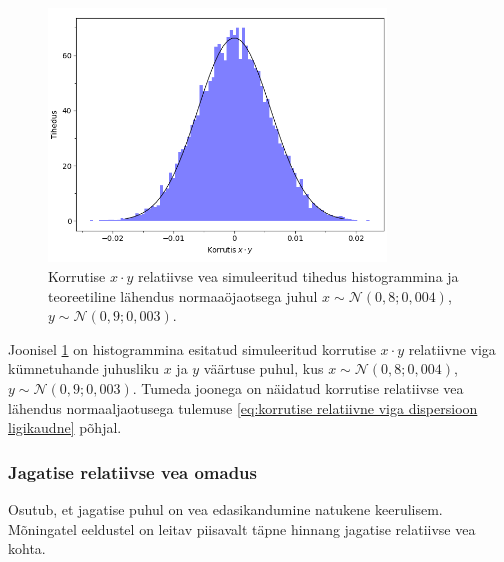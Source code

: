 \begin{figure}[H]
    \begin{center}
        \includegraphics[width=0.8\textwidth]{joonised/korrutis_relatiivne_viga.png}
    \end{center}
    \caption{Korrutise $x\cdot y$ relatiivse vea simuleeritud tihedus histogrammina ja teoreetiline lähendus normaaöjaotsega juhul $x\sim\mathcal{N}(0{,}8; 0{,}004)$, $y\sim\mathcal{N}(0{,}9; 0{,}003)$.}
    \label{fig:korrutis relatiivne viga tihedus}
\end{figure}

Joonisel \ref{fig:korrutis relatiivne viga tihedus} on histogrammina esitatud simuleeritud korrutise $x\cdot y$ relatiivne viga kümnetuhande juhusliku $x$ ja $y$ väärtuse puhul, kus $x\sim\mathcal{N}(0{,}8; 0{,}004)$, $y\sim\mathcal{N}(0{,}9; 0{,}003)$. Tumeda joonega on näidatud korrutise relatiivse vea lähendus normaaljaotusega tulemuse \eqref{eq:korrutise relatiivne viga dispersioon ligikaudne} põhjal.

\subsubsection{Jagatise relatiivse vea omadus}
Osutub, et jagatise puhul on vea edasikandumine natukene keerulisem. Mõningatel eeldustel on leitav piisavalt täpne hinnang jagatise relatiivse vea kohta.

